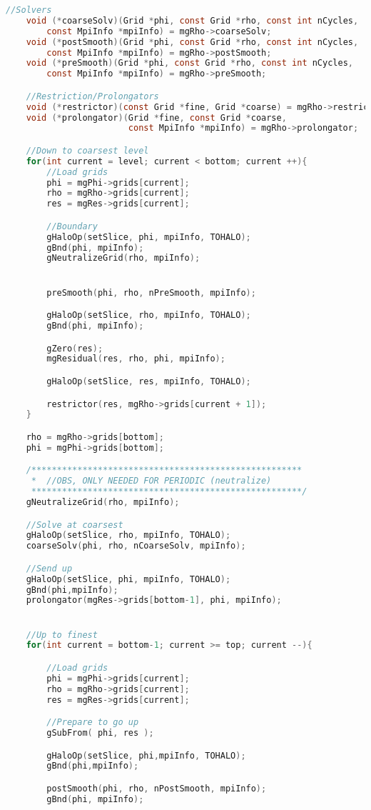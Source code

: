\begin{lstlisting}[language=c, caption = main routine]
	//Solvers
	void (*coarseSolv)(Grid *phi, const Grid *rho, const int nCycles,
		const MpiInfo *mpiInfo) = mgRho->coarseSolv;
	void (*postSmooth)(Grid *phi, const Grid *rho, const int nCycles,
		const MpiInfo *mpiInfo) = mgRho->postSmooth;
	void (*preSmooth)(Grid *phi, const Grid *rho, const int nCycles,
		const MpiInfo *mpiInfo) = mgRho->preSmooth;

	//Restriction/Prolongators
	void (*restrictor)(const Grid *fine, Grid *coarse) = mgRho->restrictor;
	void (*prolongator)(Grid *fine, const Grid *coarse,
						const MpiInfo *mpiInfo) = mgRho->prolongator;

	//Down to coarsest level
	for(int current = level; current < bottom; current ++){
		//Load grids
		phi = mgPhi->grids[current];
		rho = mgRho->grids[current];
		res = mgRes->grids[current];

		//Boundary
		gHaloOp(setSlice, phi, mpiInfo, TOHALO);
		gBnd(phi, mpiInfo);
		gNeutralizeGrid(rho, mpiInfo);


		preSmooth(phi, rho, nPreSmooth, mpiInfo);

		gHaloOp(setSlice, rho, mpiInfo, TOHALO);
		gBnd(phi, mpiInfo);

		gZero(res);
		mgResidual(res, rho, phi, mpiInfo);

		gHaloOp(setSlice, res, mpiInfo, TOHALO);

		restrictor(res, mgRho->grids[current + 1]);
	}

	rho = mgRho->grids[bottom];
	phi = mgPhi->grids[bottom];

	/*****************************************************
	 *	//OBS, ONLY NEEDED FOR PERIODIC (neutralize)
	 *****************************************************/
	gNeutralizeGrid(rho, mpiInfo);

	//Solve at coarsest
	gHaloOp(setSlice, rho, mpiInfo, TOHALO);
	coarseSolv(phi, rho, nCoarseSolv, mpiInfo);

	//Send up
	gHaloOp(setSlice, phi, mpiInfo, TOHALO);
	gBnd(phi,mpiInfo);
	prolongator(mgRes->grids[bottom-1], phi, mpiInfo);


	//Up to finest
	for(int current = bottom-1; current >= top; current --){

		//Load grids
		phi = mgPhi->grids[current];
		rho = mgRho->grids[current];
		res = mgRes->grids[current];

		//Prepare to go up
		gSubFrom( phi, res );

		gHaloOp(setSlice, phi,mpiInfo, TOHALO);
		gBnd(phi,mpiInfo);

		postSmooth(phi, rho, nPostSmooth, mpiInfo);
		gBnd(phi, mpiInfo);


\end{lstlisting}

